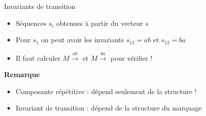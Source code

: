 \documentclass[compress]{beamer}
\begin{document}
\begin{frame}{Invariants de transition}
\begin{itemize}
\item Séquences $s_i$ obtenues à partir du vecteur $s$
\item Pour $s_1$ on peut avoir les invariants $s_{11} = ab$ et $s_{12} = ba$
\item Il faut calculer $M \stackrel{ab}{\longrightarrow}$ et $M \stackrel{ba}{\longrightarrow}$ pour vérifier !
\end{itemize}  
{\bf Remarque} 
\begin{itemize}
\item Composante répétitive : dépend seulement de la structure !
\item Invariant de transition : dépend de la structure  du  marquage
\end{itemize}
\end{frame}
\end{document}
